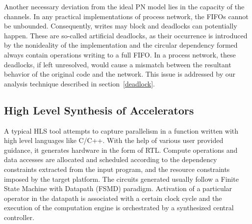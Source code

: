 \documentclass{sig-alternate}
\begin{document}
Another necessary deviation from the ideal PN model lies in the capacity of the channels.
In any practical implementations of process network, the FIFOs cannot be unbounded. 
Consequently, writes may block and deadlocks can potentially happen. 
These are so-called artificial deadlocks, as their occurrence is introduced by the nonideality of the implementation and the circular dependency formed %
always contain operations writing to a full FIFO.
In a process network, %
these deadlocks, if left unresolved, would cause a mismatch between
the resultant behavior of the original code and the network. This issue is addressed by our
analysis technique described in section~\ref{deadlock}. 

\subsection{High Level Synthesis of Accelerators}
\label{pre2}
A typical HLS tool attempts to capture parallelism in a function written with high level languages like C/C++. With the help of various user provided guidance, it generates hardware in the form of RTL.
Compute operations and data accesses are allocated and scheduled according to the dependency constraints extracted from the input program, and the resource constraints imposed by the target platform. The circuits generated usually follow a Finite State Machine with Datapath (FSMD) paradigm. Activation of a particular operator in the datapath is associated
with a certain clock cycle and the execution of the computation engine is orchestrated by a synthesized central controller. 
\end{document}
